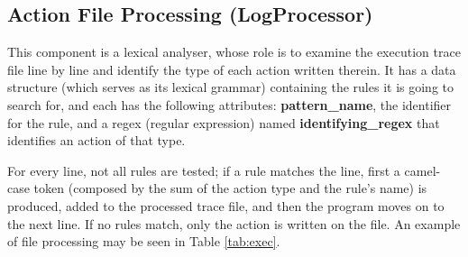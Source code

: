 \documentclass[10pt, conference, compsocconf]{IEEEtran}
\begin{document}
\subsection{Action File Processing (LogProcessor)}\label{sec:fp}

This component is a lexical analyser, whose role is to examine the execution trace file line by line and identify the type of each action written therein. It has a data structure (which serves as its lexical grammar) containing the rules it is going to search for, and each has the following attributes: \textbf{pattern\_name}, the identifier for the rule, and a regex (regular expression)%
named \textbf{identifying\_regex} that identifies an action of that type. 

For every line, not all rules are tested; if a rule matches the line, first a camel-case token (composed by the sum of the action type and the rule's name) is produced, added to the processed trace file, and then the program moves on to the next line. If no rules match, only the action is written on the file. An example of file processing may be seen in Table \ref{tab:exec}.
\end{document}
